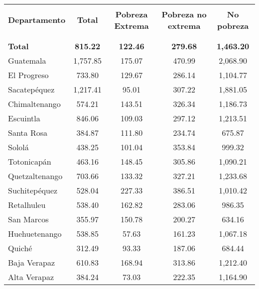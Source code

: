 \begin{center}\fontsize{4.5mm}{1em}\selectfont \setlength{\arrayrulewidth}{0.9pt}
	\textbf{}\\
	
	$\,$\\[-1cm]
	\begin{tabular}{m{45mm}S[table-format=3.2]S[table-format=3.2]S[table-format=3.2]S[table-format=5.2]}
			\hline
		 &&&&\\[-4mm]
		 \textbf{Departamento}&\textbf{Total} &\textbf{Pobreza Extrema} & \textbf{Pobreza no extrema}	& \textbf{No pobreza} \\
			&&&&\\[-0.4cm]
		\hline
		 &&&&\\[-0.4cm]
\textbf{Total}	&	 \textbf{815.22 }	&	 \textbf{122.46} 	&	 \textbf{279.68} 	&	 \textbf{1,463.20 }	 \\ 
Guatemala	&	 1,757.85 	&	 175.07 	&	 470.99 	&	 2,068.90 	 \\ 
El Progreso	&	 733.80 	&	 129.67 	&	 286.14 	&	 1,104.77 	 \\ 
Sacatepéquez	&	 1,217.41 	&	 95.01 	&	 307.22 	&	 1,881.05 	 \\ 
Chimaltenango	&	 574.21 	&	 143.51 	&	 326.34 	&	 1,186.73 	 \\ 
Escuintla	&	 846.06 	&	 109.03 	&	 297.12 	&	 1,213.51 	 \\ 
Santa Rosa	&	 384.87 	&	 111.80 	&	 234.74 	&	 675.87 	 \\ 
Sololá	&	 438.25 	&	 101.04 	&	 353.84 	&	 999.32 	 \\ 
Totonicapán	&	 463.16 	&	 148.45 	&	 305.86 	&	 1,090.21 	 \\ 
Quetzaltenango	&	 703.66 	&	 133.32 	&	 327.21 	&	 1,233.68 	 \\ 
Suchitepéquez	&	 528.04 	&	 227.33 	&	 386.51 	&	 1,010.42 	 \\ 
Retalhuleu	&	 538.40 	&	 162.82 	&	 283.06 	&	 986.35 	 \\ 
San Marcos	&	 355.97 	&	 150.78 	&	 200.27 	&	 634.16 	 \\ 
Huehuetenango	&	 538.85 	&	 57.63 	&	 161.23 	&	 1,067.18 	 \\ 
Quiché	&	 312.49 	&	 93.33 	&	 187.06 	&	 684.44 	 \\ 
Baja Verapaz	&	 610.83 	&	 168.94 	&	 313.86 	&	 1,212.40 	 \\ 
Alta Verapaz	&	 384.24 	&	 73.03 	&	 222.35 	&	 1,164.90 	 \\ 

\end{tabular}
\end{center}
